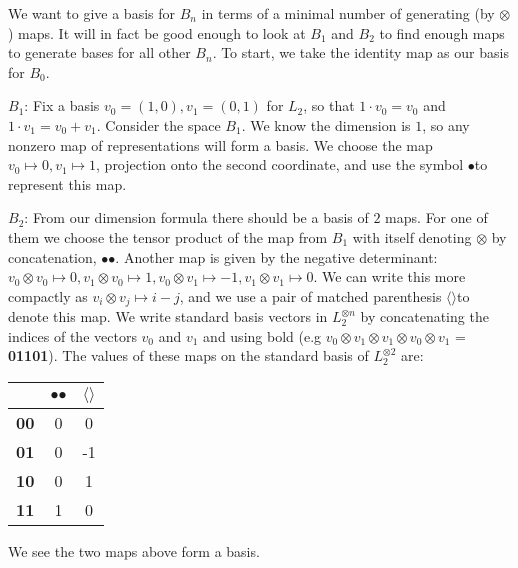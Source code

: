 \documentclass[11pt]{article} %
\newcommand{\lcap}{\boldmath$\langle$\unboldmath}
\newcommand{\rcap}{\boldmath$\rangle$\unboldmath}
\newcommand{\dotmap}{$\bullet$}
\begin{document}
We want to give a basis for $B_n$ in terms of a minimal number of generating (by $\otimes$) maps. It will in fact be good enough to look at $B_1$ and $B_2$ to find enough maps to generate bases for all other $B_n$. To start, we take the identity map as our basis for $B_0$.

\noindent\boldmath$B_1$\unboldmath: Fix a basis $v_0 = (1,0) ,v_1 = (0,1)$ for $L_2$, so that $1 \cdot v_0 = v_0$ and $1 \cdot v_1 = v_0 + v_1$. Consider the space $B_1$. We know the dimension is $1$, so any nonzero map of representations will form a basis. We choose the map $v_0 \mapsto 0, v_1 \mapsto 1$, projection onto the second coordinate, and use the symbol \dotmap\hspace{1.25mm}to represent this map.


\noindent\boldmath$B_2$\unboldmath: From our dimension formula there should be a basis of $2$ maps. For one of them we choose the tensor product of the map from $B_1$ with itself denoting $\otimes$ by concatenation, \dotmap \dotmap. Another map is given by the negative determinant: $v_0 \otimes v_0 \mapsto 0, v_1 \otimes v_0 \mapsto 1, v_0 \otimes v_1 \mapsto -1, v_1 \otimes v_1 \mapsto 0$. We can write this more compactly as $v_i \otimes v_j \mapsto i-j$, and we use a pair of matched parenthesis \lcap\rcap\hspace{1.25mm}to denote this map. We write standard basis vectors in $L_2^{\otimes n}$ by concatenating the indices of the vectors $v_0$ and $v_1$ and using bold (e.g $v_0 \otimes v_1 \otimes v_1 \otimes v_0 \otimes v_1$ = \textbf{01101}). The values of these maps on the standard basis of $L_2^{\otimes 2}$ are:

\begin{center}
\begin{tabular}{| c | c | c |}
  \hline
   & \dotmap\dotmap & \lcap\rcap \\
  \hline			
  \textbf{00} & 0 & 0 \\
  \hline
  \textbf{01} & 0 & -1 \\
  \hline
  \textbf{10} & 0 & 1 \\
  \hline
  \textbf{11} & 1 & 0 \\
  \hline

\end{tabular}
\end{center}

We see the two maps above form a basis. 
\end{document}
